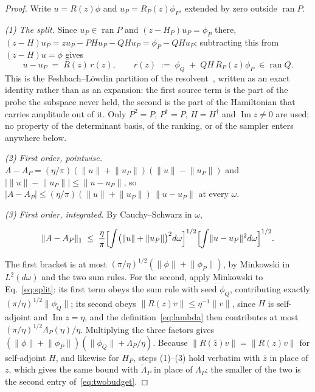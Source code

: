 \begin{proof}
Write $u=R(z)\phi$ and $u_P=R_P(z)\phi_P$, extended by zero outside $\operatorname{ran}P$.

\emph{(1) The split.} Since $u_P\in\operatorname{ran}P$ and $(z-H_P)u_P=\phi_P$ there,
$(z-H)u_P=zu_P-PHu_P-QHu_P=\phi_P-QHu_P$; subtracting this from $(z-H)u=\phi$ gives
\begin{equation}
u-u_P\;=\;R(z)\,r(z),\qquad r(z)\;:=\;\phi_Q\;+\;QH\,R_P(z)\phi_P\;\in\operatorname{ran}Q .
\label{eq:split}
\end{equation}
This is the Feshbach--L\"owdin partition of the resolvent~\cite{feshbach1958,lowdin1962}, written as an
exact identity rather than as an expansion: the first source term is the part of the probe the subspace
never held, the second is the part of the Hamiltonian that carries amplitude out of it. Only $P^{2}=P$,
$P^{\dagger}=P$, $H=H^{\dagger}$ and $\operatorname{Im}z\neq0$ are used; no property of the determinant basis, of
the ranking, or of the sampler enters anywhere below.

\emph{(2) First order, pointwise.}
$A-A_P=(\eta/\pi)(\lVert u\rVert+\lVert u_P\rVert)(\lVert u\rVert-\lVert u_P\rVert)$ and
$\bigl|\lVert u\rVert-\lVert u_P\rVert\bigr|\le\lVert u-u_P\rVert$, so
$|A-A_P|\le(\eta/\pi)(\lVert u\rVert+\lVert u_P\rVert)\,\lVert u-u_P\rVert$ at every $\omega$.

\emph{(3) First order, integrated.} By Cauchy--Schwarz in $\omega$,
\begin{widetext}
\begin{equation*}
\lVert A-A_P\rVert_1\;\le\;\frac{\eta}{\pi}
\Bigl[\int\bigl(\lVert u\rVert+\lVert u_P\rVert\bigr)^{2}d\omega\Bigr]^{1/2}
\Bigl[\int\lVert u-u_P\rVert^{2}d\omega\Bigr]^{1/2}.
\end{equation*}
\end{widetext}
The first bracket is at most $(\pi/\eta)^{1/2}(\lVert\phi\rVert+\lVert\phi_P\rVert)$, by Minkowski in
$L^{2}(d\omega)$ and the two sum rules. For the second, apply Minkowski to Eq.~\eqref{eq:split}: its
first term obeys the sum rule with seed $\phi_Q$, contributing exactly
$(\pi/\eta)^{1/2}\lVert\phi_Q\rVert$; its second obeys
$\lVert R(z)v\rVert\le\eta^{-1}\lVert v\rVert$, since $H$ is self-adjoint and $\operatorname{Im}z=\eta$,
and the definition~\eqref{eq:lambda} then contributes at most $(\pi/\eta)^{1/2}\Lambda_P(\eta)/\eta$.
Multiplying the three factors gives $(\lVert\phi\rVert+\lVert\phi_P\rVert)(\lVert\phi_Q\rVert+\Lambda_P/\eta)$.
Because $\lVert R(\bar z)v\rVert=\lVert R(z)v\rVert$ for self-adjoint $H$, and likewise for $H_P$, steps (1)--(3)
hold verbatim with $\bar z$ in place of $z$, which gives the same bound with $\tilde\Lambda_P$ in place of
$\Lambda_P$; the smaller of the two is the second entry of~\eqref{eq:twobudget}.


\end{proof}
